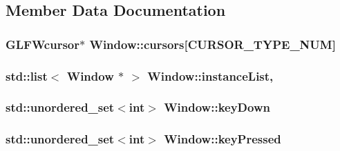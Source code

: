 \subsection{Member Data Documentation}
\hypertarget{classWindow_a3dd8cb54d02c66ad36af75d46c96494e}{}
\subsubsection[{cursors}]{\setlength{\rightskip}{0pt plus 5cm}G\+L\+F\+Wcursor$\ast$ Window\+::cursors\mbox{[}{\bf C\+U\+R\+S\+O\+R\+\_\+\+T\+Y\+P\+E\+\_\+\+N\+U\+M}\mbox{]}\hspace{0.3cm}{\ttfamily [private]}}\label{classWindow_a3dd8cb54d02c66ad36af75d46c96494e}
\hypertarget{classWindow_a127957577b44e2088ae14c43be926c23}{}
\subsubsection[{instance\+List}]{\setlength{\rightskip}{0pt plus 5cm}std\+::list$<$ {\bf Window} $\ast$ $>$ Window\+::instance\+List\hspace{0.3cm}{\ttfamily [static]}, {\ttfamily [private]}}\label{classWindow_a127957577b44e2088ae14c43be926c23}
\hypertarget{classWindow_a94a88a2fcc3cb7a2bf185a826fdc4f4a}{}
\subsubsection[{key\+Down}]{\setlength{\rightskip}{0pt plus 5cm}std\+::unordered\+\_\+set$<$int$>$ Window\+::key\+Down\hspace{0.3cm}{\ttfamily [private]}}\label{classWindow_a94a88a2fcc3cb7a2bf185a826fdc4f4a}
\hypertarget{classWindow_a9d50c88c4f961f1a04df6277ac5d7e04}{}
\subsubsection[{key\+Pressed}]{\setlength{\rightskip}{0pt plus 5cm}std\+::unordered\+\_\+set$<$int$>$ Window\+::key\+Pressed\hspace{0.3cm}{\ttfamily [private]}}\label{classWindow_a9d50c88c4f961f1a04df6277ac5d7e04}
\hypertarget{classWindow_a7a550555d11ea29c11c676dacd461a9d}{}
